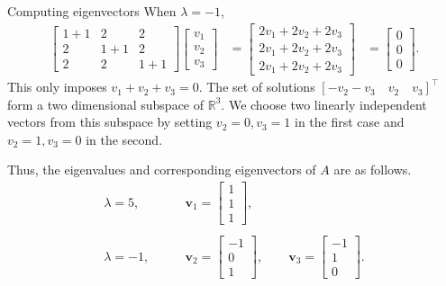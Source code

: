 \documentclass{beamer}
\def\v{\bm{v}}
\begin{document}
        \begin{frame}{Computing eigenvectors}
                When $\lambda = -1$,
                \begin{align*}
                        \begin{bmatrix}
                                1 + 1 & 2 & 2 \\ 2 & 1 + 1 & 2 \\ 2 & 2 & 1 + 1
                        \end{bmatrix}
                        \begin{bmatrix}
                                v_{1} \\ v_{2} \\ v_{3}
                        \end{bmatrix}
                        &= \begin{bmatrix}
                                2v_1 + 2v_2 + 2v_3 \\
                                2v_1 + 2v_2 + 2v_3 \\
                                2v_1 + 2v_2 + 2v_3
                        \end{bmatrix}
                        &= \begin{bmatrix}
                                0 \\ 0 \\ 0
                        \end{bmatrix}.
                \end{align*}
                This only imposes $v_1 + v_2 + v_3 = 0$. The set of solutions $[-v_2 - v_3\quad v_2\quad v_3]^\top$ form a two dimensional
                subspace of $\mathbb{R}^3$. We choose two linearly independent vectors from this subspace by setting $v_2 = 0, v_3 = 1$ in the first case
                and $v_2 = 1, v_3 = 0$ in the second.
        \end{frame}

        \begin{frame}
                Thus, the eigenvalues and corresponding eigenvectors of $A$ are as follows.
                \begin{align*}
                        \lambda = 5,  & \qquad \v_1 = \begin{bmatrix}1 \\ 1 \\ 1\end{bmatrix}, \\\\
                        \lambda = -1, & \qquad \v_2 = \begin{bmatrix}-1 \\ 0 \\ 1 \end{bmatrix}, \qquad
                                \v_3 = \begin{bmatrix}-1 \\ 1 \\ 0 \end{bmatrix}.
                \end{align*}    
        \end{frame}
\end{document}

